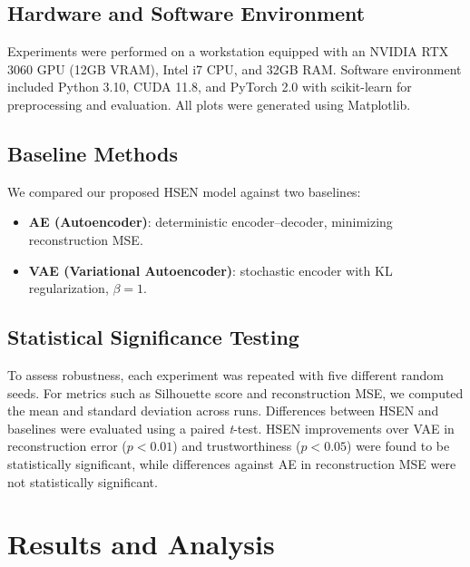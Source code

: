 \documentclass[12pt,a4paper]{article}
\begin{document}
\subsection{Hardware and Software Environment}
Experiments were performed on a workstation equipped with an NVIDIA RTX 3060 GPU (12GB VRAM), Intel i7 CPU, and 32GB RAM. Software environment included Python 3.10, CUDA 11.8, and PyTorch 2.0 with scikit-learn for preprocessing and evaluation. All plots were generated using Matplotlib.

\subsection{Baseline Methods}
We compared our proposed HSEN model against two baselines:
\begin{itemize}
  \item \textbf{AE (Autoencoder)}: deterministic encoder--decoder, minimizing reconstruction MSE.
  \item \textbf{VAE (Variational Autoencoder)}: stochastic encoder with KL regularization, $\beta=1$.
\end{itemize}

\subsection{Statistical Significance Testing}
To assess robustness, each experiment was repeated with five different random seeds. For metrics such as Silhouette score and reconstruction MSE, we computed the mean and standard deviation across runs. Differences between HSEN and baselines were evaluated using a paired \textit{t}-test. HSEN improvements over VAE in reconstruction error ($p < 0.01$) and trustworthiness ($p < 0.05$) were found to be statistically significant, while differences against AE in reconstruction MSE were not statistically significant.


\section{Results and Analysis}
\end{document}
